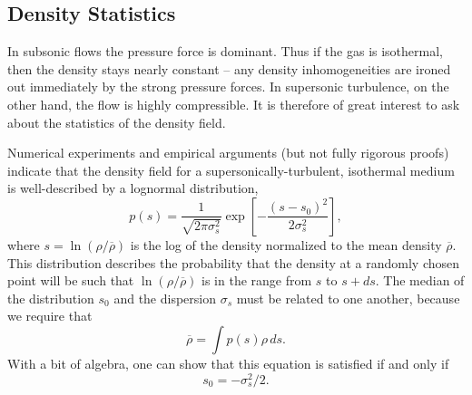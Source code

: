 \subsection{Density Statistics}

In subsonic flows the pressure force is dominant. Thus if the gas is isothermal, then the density stays nearly constant -- any density inhomogeneities are ironed out immediately by the strong pressure forces. In supersonic turbulence, on the other hand, the flow is highly compressible. It is therefore of great interest to ask about the statistics of the density field.

Numerical experiments and empirical arguments (but not fully rigorous proofs) indicate that the density field for a supersonically-turbulent, isothermal medium is well-described by a lognormal distribution,
\begin{equation}
\label{eq:denpdf}
p(s) = \frac{1}{\sqrt{2\pi \sigma_s^2}} \exp\left[-\frac{(s-s_0)^2}{2\sigma_s^2}\right],
\end{equation}
where $s=\ln(\rho/\overline{\rho})$ is the log of the density normalized to the mean density $\overline{\rho}$. This distribution describes the probability that the density at a randomly chosen point will be such that $\ln(\rho/\overline{\rho})$ is in the range from $s$ to $s+ds$. The median of the distribution $s_0$ and the dispersion $\sigma_s$ must be related to one another, because we require that
\begin{equation}
\overline{\rho} = \int p(s) \rho \, ds.
\end{equation}
With a bit of algebra, one can show that this equation is satisfied if and only if
\begin{equation}
s_0 = -\sigma_s^2/2.
\end{equation}

